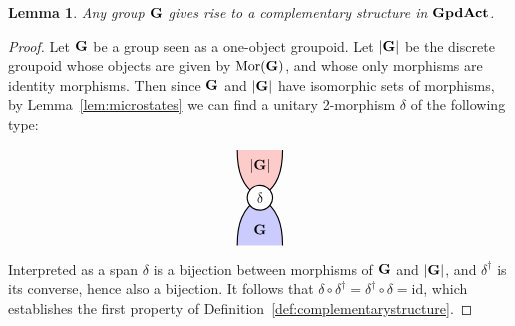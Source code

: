 \documentclass[a4paper,12pt]{article}
\newtheorem{lemma}[theorem]{Lemma}
\theoremstyle{definition}
\newcommand\cat[1]{{\ensuremath{\bf #1}}}
\renewcommand{\-}[0]{\nobreakdash-\hspace{0pt}}
\newcommand\Mor{\ensuremath{\mathrm{Mor}}}
\newcommand\id{\ensuremath{\mathrm{id}}}
\def\fillA{blue!40}
\def\fillB{red!40}
\def\sideangle{30}
\def\nwangle{180-\sideangle}
\def\neangle{\sideangle}
\def\swangle{180+\sideangle}
\def\seangle{-\sideangle}
\begin{document}
\begin{lemma}
\label{lem:compingpdact}
Any group $\cat G$ gives rise to a complementary structure in \cat{GpdAct}.
\end{lemma}
\begin{proof}
Let $\cat{G}$ be a group seen as a one-object groupoid. Let $\cat{|G|}$ be the discrete groupoid whose objects are given by $\Mor(\cat G)$, and whose only morphisms are identity morphisms. Then since \cat G and \cat{|G|} have isomorphic sets of morphisms, by Lemma~\ref{lem:microstates} we can find a unitary 2\-morphism $\delta$ of the following type:

\begin{equation}
\begin{aligned}
\begin{tikzpicture} [thick, scale=0.8, fill opacity=0.5]
\draw [fill=\fillB, draw=none, fill opacity=0.5] (0.7,0)
to [out=down, in=\neangle](0,-1.5)
to [out=\nwangle, in=down](-0.7, 0);
\draw  (0.7,0)
to [out=down, in=\neangle](0,-1.5)
to [out=\nwangle, in=down](-0.7, 0);
\draw [fill=\fillA, draw=none] (0.7,-3)
to [out=up, in=\seangle](0,-1.5)
to [out=\swangle, in=up](-0.7, -3);
\draw (0.7,-3)
to [out=up, in=\seangle](0,-1.5)
to [out=\swangle, in=up](-0.7, -3);
\node [draw, fill=white, fill opacity=1, rotate=10, shape=circle]
 at (0, -1.5) {$\delta$}; 
\node [fill opacity=1] at (0, -0.5) {$\cat{|G|}$}; 
\node [fill opacity=1] at (0, -2.5) {$\cat{G}$}; 
\end{tikzpicture}
\end{aligned}
\end{equation}
Interpreted as a span $\delta$ is a bijection between morphisms of \cat{G} and \cat{|G|}, and $\delta^{\dagger}$ is its converse, hence also a bijection. It follows that $\delta\circ\delta^{\dagger}=\delta^{\dagger}\circ\delta= \id$, which establishes the first property of Definition~\ref{def:complementarystructure}.


\end{proof}
\end{document}
